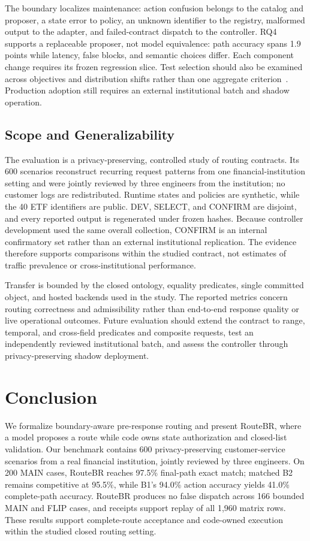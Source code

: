 \documentclass[10pt,conference,a4paper]{IEEEtran}
\newcommand{\method}{RouteBR}
\begin{document}
The boundary localizes maintenance: action confusion belongs to the catalog and proposer, a state error to policy, an unknown identifier to the registry, malformed output to the adapter, and failed-contract dispatch to the controller. RQ4 supports a replaceable proposer, not model equivalence: path accuracy spans 1.9 points while latency, false blocks, and semantic choices differ. Each component change requires its frozen regression slice. Test selection should also be examined across objectives and distribution shifts rather than one aggregate criterion~\cite{zhang2026empirical}. Production adoption still requires an external institutional batch and shadow operation.

\subsection{Scope and Generalizability}

The evaluation is a privacy-preserving, controlled study of routing contracts. Its 600 scenarios reconstruct recurring request patterns from one financial-institution setting and were jointly reviewed by three engineers from the institution; no customer logs are redistributed. Runtime states and policies are synthetic, while the 40 ETF identifiers are public. DEV, SELECT, and CONFIRM are disjoint, and every reported output is regenerated under frozen hashes. Because controller development used the same overall collection, CONFIRM is an internal confirmatory set rather than an external institutional replication. The evidence therefore supports comparisons within the studied contract, not estimates of traffic prevalence or cross-institutional performance.

Transfer is bounded by the closed ontology, equality predicates, single committed object, and hosted backends used in the study. The reported metrics concern routing correctness and admissibility rather than end-to-end response quality or live operational outcomes. Future evaluation should extend the contract to range, temporal, and cross-field predicates and composite requests, test an independently reviewed institutional batch, and assess the controller through privacy-preserving shadow deployment.

\section{Conclusion}

We formalize boundary-aware pre-response routing and present \method{}, where a model proposes a route while code owns state authorization and closed-list validation. Our benchmark contains 600 privacy-preserving customer-service scenarios from a real financial institution, jointly reviewed by three engineers. On 200 MAIN cases, \method{} reaches 97.5\% final-path exact match; matched B2 remains competitive at 95.5\%, while B1's 94.0\% action accuracy yields 41.0\% complete-path accuracy. \method{} produces no false dispatch across 166 bounded MAIN and FLIP cases, and receipts support replay of all 1,960 matrix rows. These results support complete-route acceptance and code-owned execution within the studied closed routing setting.

\clearpage


\end{document}
